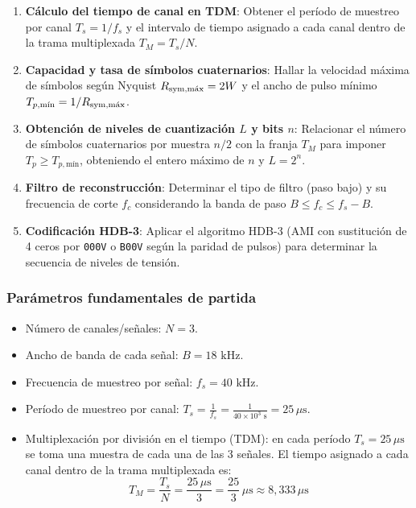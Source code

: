 \begin{resolucion}
{\begin{mecanizado}
\begin{enumerate}
    \item \textbf{Cálculo del tiempo de canal en TDM}: Obtener el período de muestreo por canal $T_s = 1/f_s$ y el intervalo de tiempo asignado a cada canal dentro de la trama multiplexada $T_M = T_s / N$.
    \item \textbf{Capacidad y tasa de símbolos cuaternarios}: Hallar la velocidad máxima de símbolos según Nyquist $R_{\text{sym,\text{máx}}} = 2W$ y el ancho de pulso mínimo $T_{p,\text{mín}} = 1 / R_{\text{sym,\text{máx}}}$.
    \item \textbf{Obtención de niveles de cuantización $L$ y bits $n$}: Relacionar el número de símbolos cuaternarios por muestra $n/2$ con la franja $T_M$ para imponer $T_p \ge T_{p,\text{mín}}$, obteniendo el entero máximo de $n$ y $L = 2^n$.
    \item \textbf{Filtro de reconstrucción}: Determinar el tipo de filtro (paso bajo) y su frecuencia de corte $f_c$ considerando la banda de paso $B \le f_c \le f_s - B$.
    \item \textbf{Codificación HDB-3}: Aplicar el algoritmo HDB-3 (AMI con sustitución de 4 ceros por \texttt{000V} o \texttt{B00V} según la paridad de pulsos) para determinar la secuencia de niveles de tensión.
\end{enumerate}
\end{mecanizado}

\begin{resolucion}
\subsubsection*{Parámetros fundamentales de partida}

\begin{itemize}
    \item Número de canales/señales: $N = 3$.
    \item Ancho de banda de cada señal: $B = 18\text{ kHz}$.
    \item Frecuencia de muestreo por señal: $f_s = 40\text{ kHz}$.
    \item Período de muestreo por canal: $T_s = \frac{1}{f_s} = \frac{1}{40\times 10^3\text{ s}} = 25 \, \mu\text{s}$.
    \item Multiplexación por división en el tiempo (TDM): en cada período $T_s = 25 \, \mu\text{s}$ se toma una muestra de cada una de las 3 señales. El tiempo asignado a cada canal dentro de la trama multiplexada es:
      \[
      T_M = \frac{T_s}{N} = \frac{25 \, \mu\text{s}}{3} = \frac{25}{3} \, \mu\text{s} \approx 8{,}333 \, \mu\text{s}
      \]
\end{itemize}


\end{resolucion}}
\end{resolucion}
